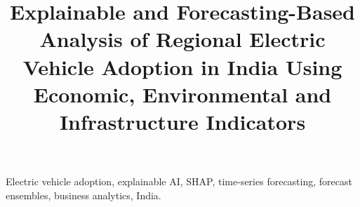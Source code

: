 \documentclass[conference]{IEEEtran}
\begin{document}
\title{Explainable and Forecasting-Based Analysis of Regional Electric Vehicle Adoption in India Using Economic, Environmental and Infrastructure Indicators}
\author{
}
\maketitle
\begin{abstract}

\end{abstract}
\begin{IEEEkeywords}
Electric vehicle adoption, explainable AI, SHAP, time-series forecasting, forecast ensembles, business analytics, India.
\end{IEEEkeywords}


\end{document}
